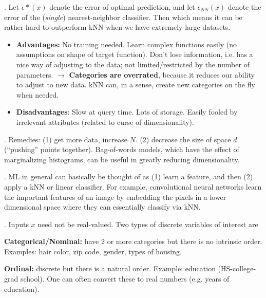\documentclass[12pt]{article}
\newcommand{\myspace}{\vspace{2\bigskipamount}}
\newcommand\p{\Needspace{10\baselineskip} \noindent}
\begin{document}
\myspace
\p {}. Let $\epsilon*(x)$ denote the error of optimal prediction, and let $\epsilon_{NN}(x)$ denote the error of the (\textit{single}) nearest-neighbor classifier. Then
which means it can be rather hard to outperform kNN when we have extremely large datasets. 
\begin{itemize}
	\item \textbf{Advantages:} No training needed. Learn complex functions easily (no assumptions on shape of target function). Don't lose information, i.e. has a nice way of adjusting to the data; not limited/restricted by the number of parameters. 
	\subitem $\rightarrow$ \textbf{Categories are overrated}, because it reduces our ability to adjust to new data. kNN can, in a sense, create new categories on the fly when needed. 
	\item \textbf{Disadvantages}: Slow at query time. Lots of storage. Easily fooled by irrelevant attributes (related to curse of dimensionality). 
\end{itemize}

\myspace
\p {}. Remedies: (1) get more data, increase $N$. (2) decrease the size of space $d$ (``pushing'' points together). Bag-of-words models, which have the effect of marginalizing histograms, can be useful in greatly reducing dimensionality.

\myspace
\p {}. ML in general can basically be thought of as (1) learn a feature, and then (2) apply a kNN or linear classifier. For example, convolutional neural networks learn the important features of an image by embedding the pixels in a lower dimensional space where they can essentially classify via kNN.


\p {}. Inputs $x$ need not be real-valued. Two types of discrete variables of interest are
\begin{compactitem}[$\rightarrow$]
	\item \textbf{Categorical/Nominal:} have 2 or more categories but there is no intrinsic order. Examples: hair color, zip code, gender, types of housing.
	\item \textbf{Ordinal:} discrete but there is a natural order. Example: education (HS-college-grad school). One can often convert these to real numbers (e.g. years of education). 
\end{compactitem}
\end{document}
